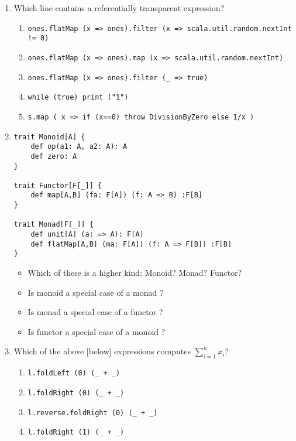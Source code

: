 \begin{enumerate}
    \item Which line contains a referentially transparent expression?
    \begin{enumerate}
        \item \texttt{ones.flatMap (x => ones).filter (x => scala.util.random.nextInt != 0)}
        
        \item \texttt{ones.flatMap (x => ones).map (x => scala.util.random.nextInt)}
        
        \item \texttt{ones.flatMap (x => ones).filter (\_ => true)}
        
        \item \texttt{while (true) print ("1")}
        
        \item \texttt{s.map ( x => if (x==0) throw DivisionByZero else 1/x )}
    \end{enumerate}
    
    \item 
        \begin{verbatim}
trait Monoid[A] {
    def op(a1: A, a2: A): A
    def zero: A
}

trait Functor[F[_]] {
    def map[A,B] (fa: F[A]) (f: A => B) :F[B]
}

trait Monad[F[_]] {
    def unit[A] (a: => A): F[A]
    def flatMap[A,B] (ma: F[A]) (f: A => F[B]) :F[B]
}
        \end{verbatim}
    \begin{itemize}
        \item Which of these is a higher kind: Monoid? Monad? Functor?
        \item Is monoid a special case of a monad ?
        \item Is monad a special case of a functor ?
        \item Is functor a special case of a monoid ?
    \end{itemize}
    
    
    
    \item Which of the above [below] expressions computes $\sum_{i=1}^n x_i$?
    
    \begin{enumerate}
        \item \texttt{l.foldLeft (0) (\_ + \_)}
        \item \texttt{l.foldRight (0) (\_ + \_)}
        \item \texttt{l.reverse.foldRight (0) (\_ + \_)}
        \item \texttt{l.foldRight (1) (\_ + \_)}
    \end{enumerate}
    

\end{enumerate}
